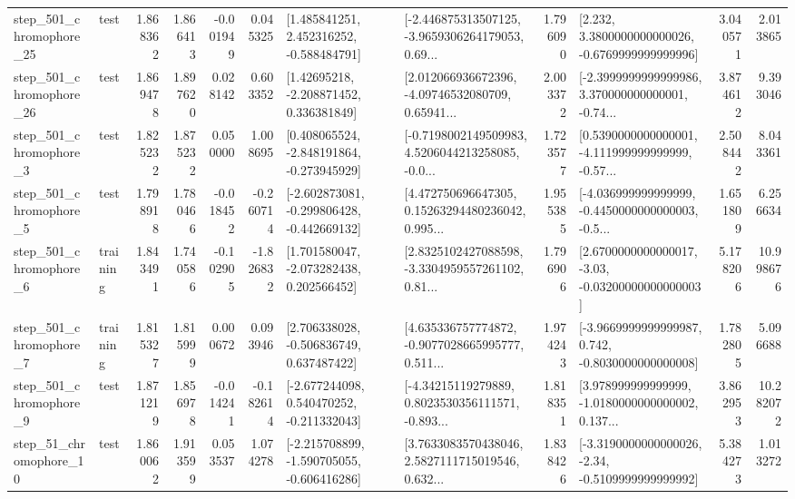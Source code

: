 \begin{tabular}{llrrrrllrlrr}
  step\_501\_chromophore\_25 &      test &      1.868362 &    1.866413 &     -0.001949 &  0.045325 &    [1.485841251, 2.452316252, -0.588484791] &  [-2.446875313507125, -3.9659306264179053, 0.69... &       1.796090 &   [2.232, 3.3800000000000026, -0.6769999999999996] &            3.040571 &          2.013865 \\
  step\_501\_chromophore\_26 &      test &      1.869478 &    1.897620 &      0.028142 &  0.603352 &     [1.42695218, -2.208871452, 0.336381849] &  [2.012066936672396, -4.09746532080709, 0.65941... &       2.003372 &  [-2.3999999999999986, 3.370000000000001, -0.74... &            3.874612 &          9.393046 \\
   step\_501\_chromophore\_3 &      test &      1.825232 &    1.875232 &      0.050000 &  1.008695 &   [0.408065524, -2.848191864, -0.273945929] &  [-0.7198002149509983, 4.5206044213258085, -0.0... &       1.723577 &  [0.5390000000000001, -4.111999999999999, -0.57... &            2.508442 &          8.043361 \\
   step\_501\_chromophore\_5 &      test &      1.798918 &    1.780466 &     -0.018452 & -0.260714 &  [-2.602873081, -0.299806428, -0.442669132] &  [4.472750696647305, 0.15263294480236042, 0.995... &       1.955385 &  [-4.036999999999999, -0.4450000000000003, -0.5... &            1.651809 &          6.256634 \\
   step\_501\_chromophore\_6 &  training &      1.843491 &    1.740586 &     -0.102905 & -1.826832 &    [1.701580047, -2.073282438, 0.202566452] &  [2.8325102427088598, -3.3304959557261102, 0.81... &       1.796906 &  [2.6700000000000017, -3.03, -0.03200000000000003] &            5.178206 &         10.998676 \\
   step\_501\_chromophore\_7 &  training &      1.815327 &    1.815999 &      0.000672 &  0.093946 &    [2.706338028, -0.506836749, 0.637487422] &  [4.635336757774872, -0.9077028665995777, 0.511... &       1.974243 &  [-3.9669999999999987, 0.742, -0.8030000000000008] &            1.782805 &          5.096688 \\
   step\_501\_chromophore\_9 &      test &      1.871219 &    1.856978 &     -0.014241 & -0.182614 &   [-2.677244098, 0.540470252, -0.211332043] &  [-4.34215119279889, 0.8023530356111571, -0.893... &       1.818351 &  [3.978999999999999, -1.0180000000000002, 0.137... &            3.862953 &         10.282072 \\
   step\_51\_chromophore\_10 &      test &      1.860062 &    1.913599 &      0.053537 &  1.074278 &  [-2.215708899, -1.590705055, -0.606416286] &  [3.7633083570438046, 2.5827111715019546, 0.632... &       1.838426 &  [-3.3190000000000026, -2.34, -0.5109999999999992] &            5.384273 &          1.013272 \\

\end{tabular}
